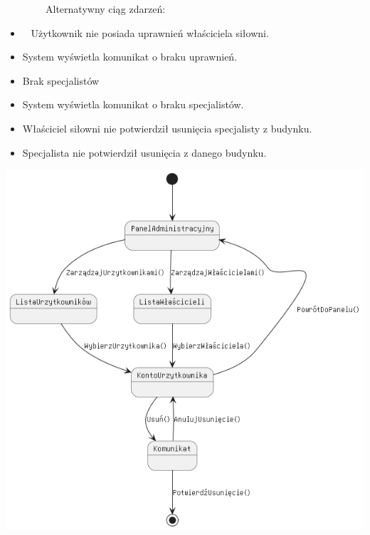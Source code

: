 \documentclass[
]{article}
\providecommand{\tightlist}{%
  \setlength{\itemsep}{0pt}\setlength{\parskip}{0pt}}
\begin{document}
{~~~~~~~~Alternatywny ciąg zdarzeń:}

\begin{itemize}
\tightlist
\item
  {~ Użytkownik nie posiada uprawnień właściciela siłowni.}
\end{itemize}

\begin{itemize}
\tightlist
\item
  {System wyświetla komunikat o braku uprawnień.}
\end{itemize}

\begin{itemize}
\tightlist
\item
  {Brak specjalistów}
\end{itemize}

\begin{itemize}
\tightlist
\item
  {System wyświetla komunikat o braku specjalistów.}
\end{itemize}

\begin{itemize}
\tightlist
\item
  {Właściciel siłowni nie potwierdził usunięcia specjalisty z budynku.}
\item
  {Specjalista nie potwierdził usunięcia z danego budynku.\\
  }
\end{itemize}

{}

{}

{}

{\includegraphics{diagrams/state/usuń_użytkownika.png}}
\end{document}
